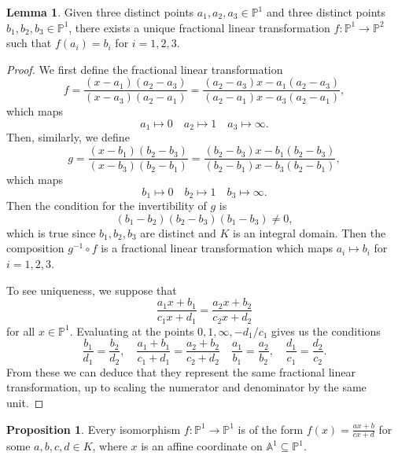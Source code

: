 \documentclass[12pt]{article}
\theoremstyle{definition}
\newtheorem{proposition}{Proposition}
\newtheorem{lemma}{Lemma}
\newcommand{\A}{\mathbb{A}}
\renewcommand{\P}{\mathbb{P}}
\newcommand{\<}{\langle}
\renewcommand{\>}{\rangle}
\begin{document}
\begin{lemma}
    Given three distinct points $a_1, a_2, a_3 \in \P^1$ and three distinct points $b_1, b_2, b_3 \in \P^1$, there exists a unique fractional linear transformation $f : \P^1 \to \P^2$ such that $f(a_i) = b_i$ for $i = 1, 2, 3$.
\end{lemma}

\begin{proof}
    We first define the fractional linear transformation
    \[
        f = \frac{(x - a_1)(a_2 - a_3)}{(x - a_3)(a_2 - a_1)}
            = \frac{(a_2 - a_3)x - a_1(a_2 - a_3)}{(a_2 - a_1)x - a_3(a_2 - a_1)},
    \]
    which maps
    \[
        a_1 \mapsto 0 \quad a_2 \mapsto 1 \quad a_3 \mapsto \infty.
    \]
    Then, similarly, we define
    \[
        g = \frac{(x - b_1)(b_2 - b_3)}{(x - b_3)(b_2 - b_1)}
            = \frac{(b_2 - b_3)x - b_1(b_2 - b_3)}{(b_2 - b_1)x - b_3(b_2 - b_1)},
    \]
    which maps
    \[
        b_1 \mapsto 0 \quad b_2 \mapsto 1 \quad b_3 \mapsto \infty.
    \]
    Then the condition for the invertibility of $g$ is
    \[
        (b_1 - b_2)(b_2 - b_3)(b_1 - b_3) \ne 0,
    \]
    which is true since $b_1, b_2, b_3$ are distinct and $K$ is an integral domain. Then the composition $g^{-1} \circ f$ is a fractional linear transformation which maps $a_i \mapsto b_i$ for $i = 1, 2, 3$.
    
    To see uniqueness, we suppose that
    \[
        \frac{a_1x + b_1}{c_1x + d_1} = \frac{a_2x + b_2}{c_2x + d_2}
    \]
    for all $x \in \P^1$. Evaluating at the points $0, 1, \infty, -d_1/c_1$ gives us the conditions
    \[
        \frac{b_1}{d_1} = \frac{b_2}{d_2},
        \quad
        \frac{a_1 + b_1}{c_1 + d_1} = \frac{a_2 + b_2}{c_2 + d_2}
        \quad
        \frac{a_1}{b_1} = \frac{a_2}{b_2},
        \quad
        \frac{d_1}{c_1} = \frac{d_2}{c_2}.
    \]
    From these we can deduce that they represent the same fractional linear transformation, up to scaling the numerator and denominator by the same unit.

\end{proof}

\begin{proposition}
    Every isomorphism $f : \P^1 \to \P^1$ is of the form $f(x) = \frac{ax + b}{cx + d}$ for some $a, b, c, d \in K$, where $x$ is an affine coordinate on $\A^1 \subseteq \P^1$.
\end{proposition}
\end{document}
